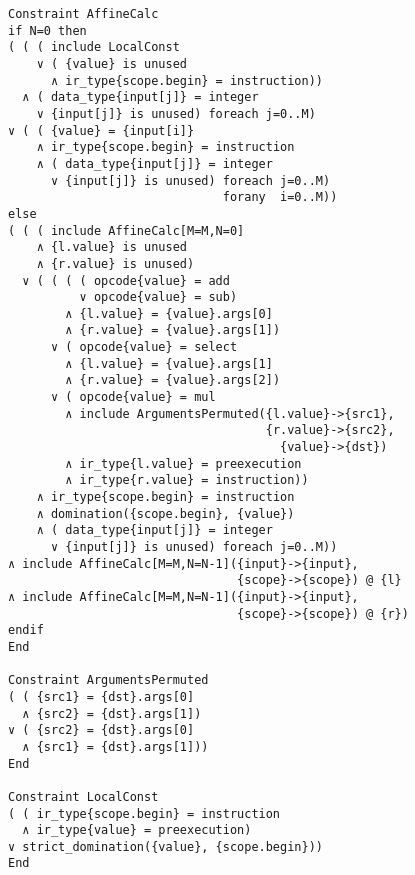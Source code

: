 \begin{figure}[p]
\begin{lstlisting}[language=CAnDL,basicstyle=\linespread{0.8}\ttfamily,
                   firstnumber=142]
Constraint AffineCalc
if N=0 then
( ( ( include LocalConst
    ∨ ( {value} is unused
      ∧ ir_type{scope.begin} = instruction))
  ∧ ( data_type{input[j]} = integer
    ∨ {input[j]} is unused) foreach j=0..M)
∨ ( ( {value} = {input[i]}
    ∧ ir_type{scope.begin} = instruction
    ∧ ( data_type{input[j]} = integer
      ∨ {input[j]} is unused) foreach j=0..M)
                              forany  i=0..M))
else
( ( ( include AffineCalc[M=M,N=0]
    ∧ {l.value} is unused
    ∧ {r.value} is unused)
  ∨ ( ( ( ( opcode{value} = add
          ∨ opcode{value} = sub)
        ∧ {l.value} = {value}.args[0]
        ∧ {r.value} = {value}.args[1])
      ∨ ( opcode{value} = select
        ∧ {l.value} = {value}.args[1]
        ∧ {r.value} = {value}.args[2])
      ∨ ( opcode{value} = mul
        ∧ include ArgumentsPermuted({l.value}->{src1},
                                    {r.value}->{src2},
                                      {value}->{dst})
        ∧ ir_type{l.value} = preexecution
        ∧ ir_type{r.value} = instruction))
    ∧ ir_type{scope.begin} = instruction
    ∧ domination({scope.begin}, {value})
    ∧ ( data_type{input[j]} = integer
      ∨ {input[j]} is unused) foreach j=0..M))
∧ include AffineCalc[M=M,N=N-1]({input}->{input},
                                {scope}->{scope}) @ {l}
∧ include AffineCalc[M=M,N=N-1]({input}->{input},
                                {scope}->{scope}) @ {r})
endif
End

Constraint ArgumentsPermuted
( ( {src1} = {dst}.args[0]
  ∧ {src2} = {dst}.args[1])
∨ ( {src2} = {dst}.args[0]
  ∧ {src1} = {dst}.args[1]))
End

Constraint LocalConst
( ( ir_type{scope.begin} = instruction
  ∧ ir_type{value} = preexecution)
∨ strict_domination({value}, {scope.begin}))
End
\end{lstlisting}
\end{figure}
